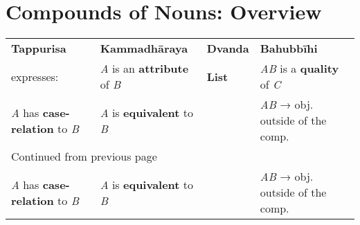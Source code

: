 \documentclass[a4paper]{memoir}
\begin{document}
\section{Compounds of Nouns: Overview}
\label{sec:org64bc931}

\hspace{-20pt}%
\begin{minipage}{\linewidth+10pt}%

\begin{longtable}{llll}
\textbf{Tappurisa} & \textbf{Kammadhāraya} & \textbf{Dvanda} & \textbf{Bahubbīhi}\\[0pt]
expresses: & \emph{A} is an \textbf{attribute} of \emph{B} & \textbf{List} & \emph{AB} is a \textbf{quality} of \emph{C}\\[0pt]
\emph{A} has \textbf{case-relation} to \emph{B} & \emph{A} is \textbf{equivalent} to \emph{B} &  & \emph{AB} → obj. outside of the comp.\\[0pt]
\hline
\endfirsthead
\multicolumn{4}{l}{Continued from previous page} \\[0pt]

\emph{A} has \textbf{case-relation} to \emph{B} & \emph{A} is \textbf{equivalent} to \emph{B} &  & \emph{AB} → obj. outside of the comp. \\[0pt]


\end{longtable}
\end{minipage}
\end{document}
